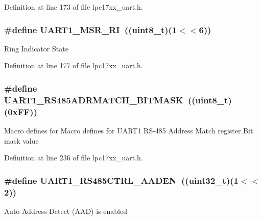 \-Definition at line 173 of file lpc17xx\-\_\-uart.\-h.

\hypertarget{group___u_a_r_t___private___macros_gad2a5a9572d8e00d40add31ca00264d74}{
\subsubsection[{\-U\-A\-R\-T1\-\_\-\-M\-S\-R\-\_\-\-R\-I}]{\setlength{\rightskip}{0pt plus 5cm}\#define {\bf \-U\-A\-R\-T1\-\_\-\-M\-S\-R\-\_\-\-R\-I}~((uint8\-\_\-t)(1$<$$<$6))}}\label{group___u_a_r_t___private___macros_gad2a5a9572d8e00d40add31ca00264d74}
\-Ring \-Indicator \-State 

\-Definition at line 177 of file lpc17xx\-\_\-uart.\-h.

\hypertarget{group___u_a_r_t___private___macros_ga11af35ea993b841f116337dde36aeaa9}{
\subsubsection[{\-U\-A\-R\-T1\-\_\-\-R\-S485\-A\-D\-R\-M\-A\-T\-C\-H\-\_\-\-B\-I\-T\-M\-A\-S\-K}]{\setlength{\rightskip}{0pt plus 5cm}\#define {\bf \-U\-A\-R\-T1\-\_\-\-R\-S485\-A\-D\-R\-M\-A\-T\-C\-H\-\_\-\-B\-I\-T\-M\-A\-S\-K}~((uint8\-\_\-t)(0x\-F\-F))}}\label{group___u_a_r_t___private___macros_ga11af35ea993b841f116337dde36aeaa9}
\-Macro defines for \-Macro defines for \-U\-A\-R\-T1 \-R\-S-\/485 \-Address \-Match register \-Bit mask value 

\-Definition at line 236 of file lpc17xx\-\_\-uart.\-h.

\hypertarget{group___u_a_r_t___private___macros_gacf6b20c310ad50b23669afbc56f0f005}{
\subsubsection[{\-U\-A\-R\-T1\-\_\-\-R\-S485\-C\-T\-R\-L\-\_\-\-A\-A\-D\-E\-N}]{\setlength{\rightskip}{0pt plus 5cm}\#define {\bf \-U\-A\-R\-T1\-\_\-\-R\-S485\-C\-T\-R\-L\-\_\-\-A\-A\-D\-E\-N}~((uint32\-\_\-t)(1$<$$<$2))}}\label{group___u_a_r_t___private___macros_gacf6b20c310ad50b23669afbc56f0f005}
\-Auto \-Address \-Detect (\-A\-A\-D) is enabled 

